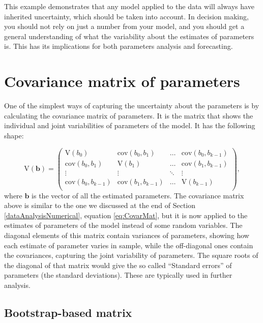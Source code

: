 \documentclass[
]{book}
\theoremstyle{definition}
\theoremstyle{definition}
\theoremstyle{definition}
\theoremstyle{definition}
\theoremstyle{remark}
\begin{document}
This example demonstrates that any model applied to the data will always have inherited uncertainty, which should be taken into account. In decision making, you should not rely on just a number from your model, and you should get a general understanding of what the variability about the estimates of parameters is. This has its implications for both parameters analysis and forecasting.

\section{Covariance matrix of parameters}\label{uncertaintyRegressionCov}

One of the simplest ways of capturing the uncertainty about the parameters is by calculating the covariance matrix of parameters. It is the matrix that shows the individual and joint variabilities of parameters of the model. It has the following shape:

\begin{equation}
\mathrm{V}({\boldsymbol{b}}) =
\begin{pmatrix}
\mathrm{V}(b_0) & \mathrm{cov}(b_0, b_1) & \dots & \mathrm{cov}(b_0, b_{k-1}) \\
\mathrm{cov}(b_0, b_1) & \mathrm{V}(b_1) & \dots & \mathrm{cov}(b_1, b_{k-1}) \\
\vdots & \vdots & \ddots & \vdots \\
\mathrm{cov}(b_0, b_{k-1}) & \mathrm{cov}(b_1, b_{k-1}) & \dots & \mathrm{V}(b_{k-1}) \\
\end{pmatrix} ,
\label{eq:MLRParameterCov}
\end{equation}
where \({\boldsymbol{b}}\) is the vector of all the estimated parameters. The covariance matrix above is similar to the one we discussed at the end of Section \ref{dataAnalysisNumerical}, equation \eqref{eq:CovarMat}, but it is now applied to the estimates of parameters of the model instead of some random variables. The diagonal elements of this matrix contain variances of parameters, showing how each estimate of parameter varies in sample, while the off-diagonal ones contain the covariances, capturing the joint variability of parameters. The square roots of the diagonal of that matrix would give the so called ``Standard errors'' of parameters (the standard deviations). These are typically used in further analysis.

\subsection{Bootstrap-based matrix}\label{bootstrap-based-matrix}
\end{document}
